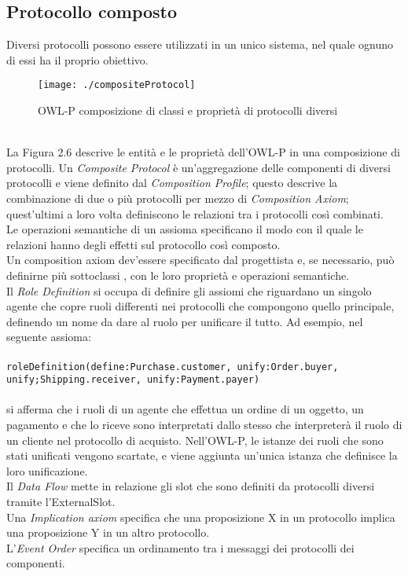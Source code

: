 \documentclass[a4paper,12pt]{report}
\begin{document}
\subsection{Protocollo composto}
Diversi protocolli possono essere utilizzati in un unico sistema, nel quale ognuno di essi ha il proprio obiettivo.
\begin{figure}[h]
    \begin{center}
        \texttt{[image: ./compositeProtocol]}
        \caption{OWL-P composizione di classi e proprietà di protocolli diversi}
        \label{compositeProtocol}
    \end{center}
\end{figure}
\\La Figura 2.6 descrive le entità e le proprietà dell'OWL-P in una composizione di protocolli. Un \textit{Composite Protocol} è un'aggregazione delle componenti di diversi protocolli e viene definito dal \textit{Composition Profile}; questo descrive la combinazione di due o più protocolli per mezzo di \textit{Composition Axiom}; quest'ultimi a loro volta definiscono le relazioni tra i protocolli così combinati.\\
Le operazioni semantiche di un assioma specificano il modo con il quale le relazioni hanno degli effetti sul protocollo così composto.\\
Un composition axiom dev'essere specificato dal progettista e, se necessario, può definirne più sottoclassi , con le loro proprietà e operazioni semantiche.\\
Il \textit{Role Definition} si occupa di definire gli assiomi che riguardano un singolo agente che copre ruoli differenti nei protocolli che compongono quello principale, definendo un nome da dare al ruolo per unificare il tutto.
\newpage
Ad esempio, nel seguente assioma:\\ \\
\texttt{roleDefinition(define:Purchase.customer, unify:Order.buyer,\\unify;Shipping.receiver, unify:Payment.payer)}\\
\\si afferma che i ruoli di un agente che effettua un ordine di un oggetto, un pagamento e che lo riceve sono interpretati dallo stesso che interpreterà il ruolo di un cliente nel protocollo di acquisto. Nell'OWL-P, le istanze dei ruoli che sono stati unificati vengono scartate, e viene aggiunta un'unica istanza che definisce la loro  unificazione.\\
Il \textit{Data Flow} mette in relazione gli slot che sono definiti da protocolli diversi tramite l'ExternalSlot.\\
Una \textit{Implication axiom} specifica che una proposizione X in un protocollo implica una proposizione Y in un altro protocollo.\\
L'\textit{Event Order} specifica un ordinamento tra i messaggi dei protocolli dei componenti.
\end{document}
